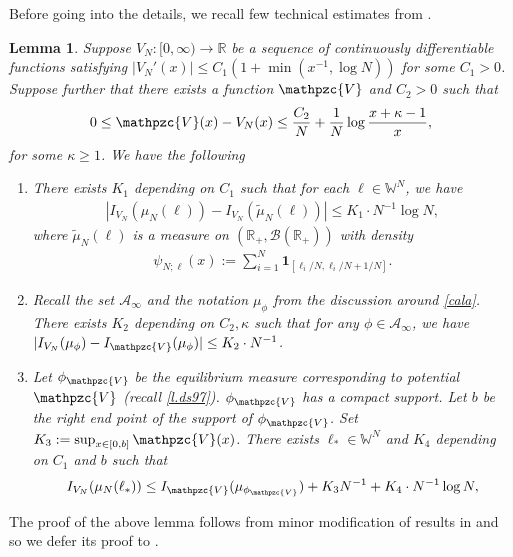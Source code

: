 \documentclass[reqno,11pt]{amsart}
\newcommand{\ind}{\mathbf{1}}
\numberwithin{equation}{section}
\newtheorem{lemma}[proposition]{Lemma}
\theoremstyle{definition}
\newcommand{\R}{\mathbb{R}}
\begin{document}
Before going into the details, we recall few technical estimates from \cite{das2022large}. 
\begin{lemma}\label{l.dd22} Suppose $V_N: [0,\infty)\to \R$ be a sequence of continuously differentiable functions satisfying $|V_N'(x)|\le C_1(1+\min(x^{-1},\log N))$ for some $C_1>0$. Suppose further that there exists a function $\mathpzc{V}$ and $C_2>0$ such that
\begin{align} \label{e.vclose}
    0 \le \mathpzc{V}(x)-V_N(x) \le \frac{C_2}{N}+\frac{1}{N}\log\frac{x+\kappa-1}{x},
\end{align}
for some $\kappa \ge 1$. We have the following
    \begin{enumerate}[label=(\alph*),leftmargin=18pt]
    \item \label{dda} There exists $K_1$ depending on $C_1$ such that for each $\ell\in \mathbb{W}^N$, we have \begin{align}
        \label{aineq}
        |I_{V_N}(\mu_N(\ell))-I_{V_N}(\widetilde{\mu}_N(\ell))| \le K_1 \cdot N^{-1}\log N,
    \end{align} where $\widetilde{\mu}_N(\ell)$ is a measure on $(\R_+,\mathcal{B}(\R_+))$ with density
    \begin{align*}
        \psi_{N;\ell}(x):=\sum_{i=1}^N \ind_{[\ell_i/N,\ell_i/N+1/N]}.
    \end{align*}
        \item \label{ddb} Recall the set $\mathcal{A}_{\infty}$ and the notation $\mu_\phi$ from the discussion around \eqref{cala}. There exists $K_2$ depending on $C_2, \kappa$ such that for any $\phi\in \mathcal{A}_\infty$, we have $|I_{V_N}(\mu_\phi)- I_{\mathpzc{V}}(\mu_\phi)| \le K_2\cdot N^{-1}$.
        \item \label{ddc} Let $\phi_{\mathpzc{V}}$ be the equilibrium measure corresponding to potential $\mathpzc{V}$ (recall \eqref{l.ds97}). $\phi_{\mathpzc{V}}$ has a compact support. Let $b$ be the right end point of the support of $\phi_{\mathpzc{V}}$. Set $K_3:=\sup_{x\in [0,b]} \mathpzc{V}(x)$.
There exists $\ell_*\in \mathbb{W}^N$ and $K_4$ depending on $C_1$ and $b$ such that
        \begin{align*}
            I_{V_N}(\mu_N(\ell_*)) \le I_{\mathpzc{V}}(\mu_{\phi_{\mathpzc{V}}})+K_3N^{-1}+K_4 \cdot N^{-1}\log N,
        \end{align*}
    \end{enumerate}
\end{lemma}
The proof of the above lemma follows from minor modification of results in \cite{das2022large} and so we defer its proof to .
\end{document}
